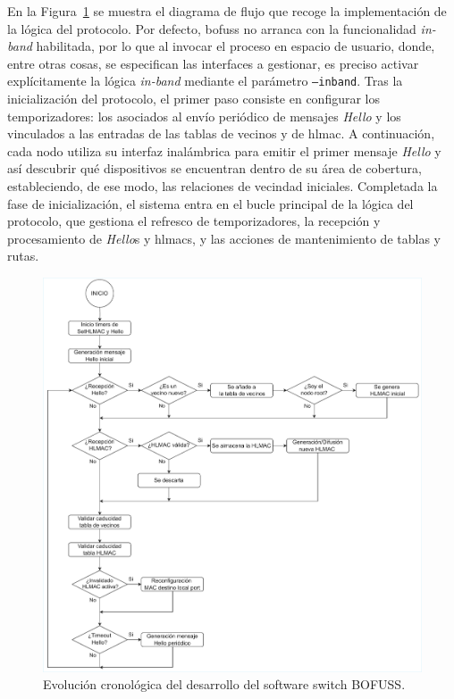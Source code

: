 En la Figura~\ref{fig:in_band_6} se muestra el diagrama de flujo que recoge la implementación de la lógica del protocolo. Por defecto, \gls{bofuss} no arranca con la funcionalidad \emph{in-band} habilitada, por lo que al invocar el proceso en espacio de usuario, donde, entre otras cosas, se especifican las interfaces a gestionar, es preciso activar explícitamente la lógica \emph{in-band} mediante el parámetro \texttt{--inband}. Tras la inicialización del protocolo, el primer paso consiste en configurar los temporizadores: los asociados al envío periódico de mensajes \textit{Hello} y los vinculados a las entradas de las tablas de vecinos y de \gls{hlmac}. A continuación, cada nodo utiliza su interfaz inalámbrica para emitir el primer mensaje \textit{Hello} y así descubrir qué dispositivos se encuentran dentro de su área de cobertura, estableciendo, de ese modo, las relaciones de vecindad iniciales. Completada la fase de inicialización, el sistema entra en el bucle principal de la lógica del protocolo, que gestiona el refresco de temporizadores, la recepción y procesamiento de \textit{Hello}s y \gls{hlmac}s, y las acciones de mantenimiento de tablas y rutas.

\begin{figure}[ht!]
    \centering
    \includegraphics[width=\textwidth]{fig/04_in-band/in_band_6.drawio.pdf}
    \caption{Evolución cronológica del desarrollo del software switch BOFUSS.} 
    \label{fig:in_band_6}
\end{figure}

